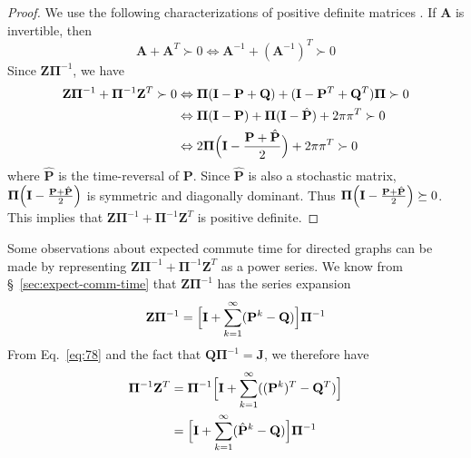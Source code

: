 \begin{proof}
  We use the
  following characterizations of positive definite matrices
  \citep[see][\S
  1.2]{boley09:_gener_laplac,horn94:_topic_in_matrix_analy}. If
  $\mathbf{A}$ is invertible, then
  \begin{equation}
    \label{eq:74}
    \mathbf{A} + \mathbf{A}^{T} \succ 0 \Leftrightarrow
    \mathbf{A}^{-1} + (\mathbf{A}^{-1})^{T} \succ 0
  \end{equation}
  Since $\mathbf{Z}\bm{\Pi}^{-1}$, we have
  \begin{equation}
    \label{eq:75}
    \begin{split}
      \mathbf{Z}\bm{\Pi}^{-1} + \bm{\Pi}^{-1}\mathbf{Z}^{T} \succ 0
      & \Leftrightarrow \bm{\Pi}(\mathbf{I} - \mathbf{P} + \mathbf{Q}) +
      (\mathbf{I} - \mathbf{P}^{T} + \mathbf{Q}^{T}) \bm{\Pi} \succ 0  \\
      & \Leftrightarrow \bm{\Pi}(\mathbf{I} - \mathbf{P}) +
      \bm{\Pi}(\mathbf{I} - \hat{\mathbf{P}}) + 2 \pi \pi^{T} \succ 0 \\
      & \Leftrightarrow 2 \bm{\Pi}\Bigl(\mathbf{I} - \frac{\mathbf{P} +
        \hat{\mathbf{P}}}{2}\Bigr) + 2\pi\pi^{T} \succ 0
    \end{split}
  \end{equation}
  where $\hat{\mathbf{P}}$ is the time-reversal of $\mathbf{P}$. Since
  $\hat{\mathbf{P}}$ is also a stochastic matrix,
  $\bm{\Pi}\Bigl(\mathbf{I} - \tfrac{\mathbf{P} +
    \hat{\mathbf{P}}}{2}\Bigr)$ is symmetric and diagonally dominant. Thus
  $\bm{\Pi}\Bigl(\mathbf{I} - \tfrac{\mathbf{P} +
    \hat{\mathbf{P}}}{2}\Bigr) \succeq 0$. This implies that
  $\mathbf{Z}\bm{\Pi}^{-1} + \bm{\Pi}^{-1}\mathbf{Z}^{T}$ is positive
  definite. 
\end{proof}
Some observations about expected commute time for directed graphs can
be made by representing $\mathbf{Z}\bm{\Pi}^{-1} +
\bm{\Pi}^{-1}\mathbf{Z}^{T}$ as a power series. We know from \S~\ref{sec:expect-comm-time} that $\mathbf{Z}\bm{\Pi}^{-1}$ has the
series expansion
\begin{equation*}
  \mathbf{Z}\bm{\Pi}^{-1} = \Bigl[ \mathbf{I} +
  \sum_{k=1}^{\infty}(\mathbf{P}^{k} - \mathbf{Q})\Bigr] \bm{\Pi}^{-1}
\end{equation*}
From Eq.~\eqref{eq:78} and the fact that $\mathbf{Q}\bm{\Pi}^{-1} =
\mathbf{J}$, we therefore have 
\begin{equation*}
  \begin{split}
    \bm{\Pi}^{-1} \mathbf{Z}^{T} &= \bm{\Pi}^{-1} \Bigl[ \mathbf{I} +
    \sum_{k=1}^{\infty}((\mathbf{P}^{k})^{T} - \mathbf{Q}^{T})\Bigr] \\
    &= \Bigl[ \mathbf{I} +
    \sum_{k=1}^{\infty}(\hat{\mathbf{P}}^{k} - \mathbf{Q})\Bigr]
    \bm{\Pi}^{-1}
  \end{split}
\end{equation*}
